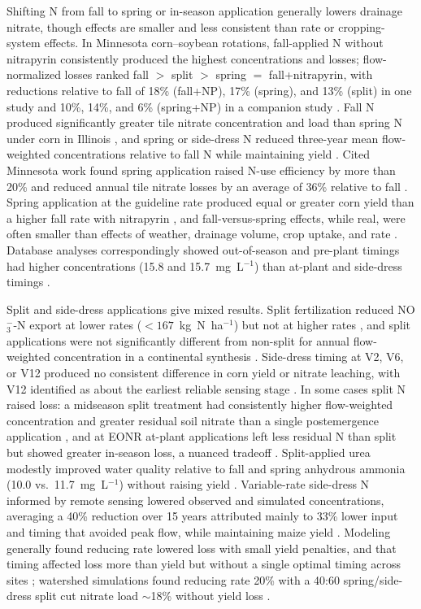 Shifting N from fall to spring or in-season application generally lowers drainage nitrate, though effects are smaller and less consistent than rate or cropping-system effects. In Minnesota corn--soybean rotations, fall-applied N without nitrapyrin consistently produced the highest concentrations and losses; flow-normalized losses ranked fall $>$ split $>$ spring $=$ fall+nitrapyrin, with reductions relative to fall of 18\% (fall+NP), 17\% (spring), and 13\% (split) in one study \parencite{Randall2003} and 10\%, 14\%, and 6\% (spring+NP) in a companion study \parencite{Randall2005}. Fall N produced significantly greater tile nitrate concentration and load than spring N under corn in Illinois \parencite{Gentry2024}, and spring or side-dress N reduced three-year mean flow-weighted concentrations relative to fall N while maintaining yield \parencite{Pittelkow2017}. Cited Minnesota work found spring application raised N-use efficiency by more than 20\% and reduced annual tile nitrate losses by an average of 36\% relative to fall \parencite{Dinnes2002}. Spring application at the guideline rate produced equal or greater corn yield than a higher fall rate with nitrapyrin \parencite{Vetsch2019}, and fall-versus-spring effects, while real, were often smaller than effects of weather, drainage volume, crop uptake, and rate \parencite{Liu2021}. Database analyses correspondingly showed out-of-season and pre-plant timings had higher concentrations (15.8 and 15.7~mg~L$^{-1}$) than at-plant and side-dress timings \parencite{Hertzberger2019}.

Split and side-dress applications give mixed results. Split fertilization reduced NO$_3^-$-N export at lower rates ($<167$~kg~N~ha$^{-1}$) but not at higher rates \parencite{Liu2021}, and split applications were not significantly different from non-split for annual flow-weighted concentration in a continental synthesis \parencite{Hertzberger2019}. Side-dress timing at V2, V6, or V12 produced no consistent difference in corn yield or nitrate leaching, with V12 identified as about the earliest reliable sensing stage \parencite{Jaynes2013}. In some cases split N raised loss: a midseason split treatment had consistently higher flow-weighted concentration and greater residual soil nitrate than a single postemergence application \parencite{Jaynes2006}, and at EONR at-plant applications left less residual N than split but showed greater in-season loss, a nuanced tradeoff \parencite{Bandura2025}. Split-applied urea modestly improved water quality relative to fall and spring anhydrous ammonia (10.0 vs.\ 11.7~mg~L$^{-1}$) without raising yield \parencite{Waring2022}. Variable-rate side-dress N informed by remote sensing lowered observed and simulated concentrations, averaging a 40\% reduction over 15 years attributed mainly to 33\% lower input and timing that avoided peak flow, while maintaining maize yield \parencite{Wilson2020b}. Modeling generally found reducing rate lowered loss with small yield penalties, and that timing affected loss more than yield but without a single optimal timing across sites \parencite{Jeong2018}; watershed simulations found reducing rate 20\% with a 40:60 spring/side-dress split cut nitrate load $\sim$18\% without yield loss \parencite{Singh2023}.

